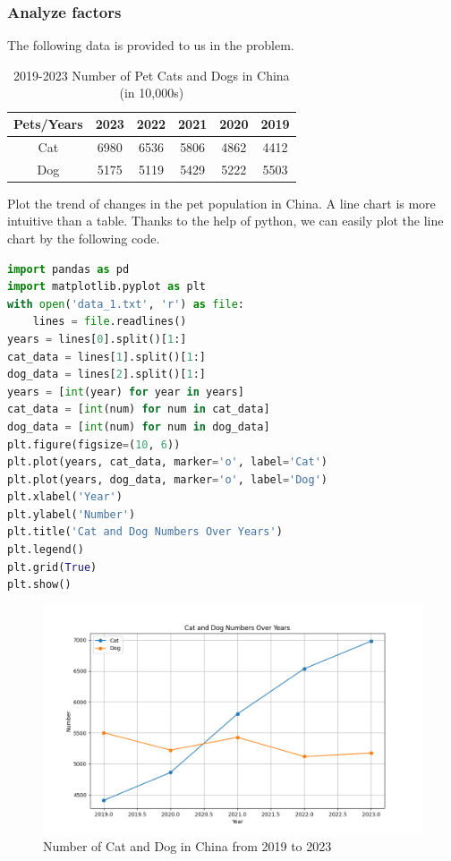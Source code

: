 \documentclass[withoutpreface,bwprint]{cumcmthesis} %
\begin{document}
\subsubsection{Analyze factors}
\par The following data is provided to us in the problem.
\begin{table}[!htbp]
    \caption{2019-2023 Number of Pet Cats and Dogs in China (in 10,000s)} \centering
    \begin{tabular}{cccccc}
    \toprule[1.5pt]
    Pets/Years & 2023 & 2022 & 2021 & 2020 & 2019 \\
    \midrule[1pt]
    Cat & 6980 & 6536 & 5806 & 4862 & 4412 \\
    Dog & 5175 & 5119 & 5429 & 5222 & 5503 \\
    \bottomrule[1.5pt]
    \end{tabular}
    \end{table}
\par Plot the trend of changes in the pet population in China. 
A line chart is more intuitive than a table.
Thanks to the help of python, we can easily plot the line chart by the following code.
\begin{lstlisting}[language=python]
import pandas as pd
import matplotlib.pyplot as plt
with open('data_1.txt', 'r') as file:
    lines = file.readlines()
years = lines[0].split()[1:]
cat_data = lines[1].split()[1:]
dog_data = lines[2].split()[1:]
years = [int(year) for year in years]
cat_data = [int(num) for num in cat_data]
dog_data = [int(num) for num in dog_data]
plt.figure(figsize=(10, 6))
plt.plot(years, cat_data, marker='o', label='Cat')
plt.plot(years, dog_data, marker='o', label='Dog')
plt.xlabel('Year')
plt.ylabel('Number')
plt.title('Cat and Dog Numbers Over Years')
plt.legend()
plt.grid(True)
plt.show()
\end{lstlisting}
\begin{figure}[htbp]
	\centering
	\includegraphics[scale=0.6]{Figure_2}
	\caption{Number of Cat and Dog in China from 2019 to 2023}
\end{figure}
\end{document}
